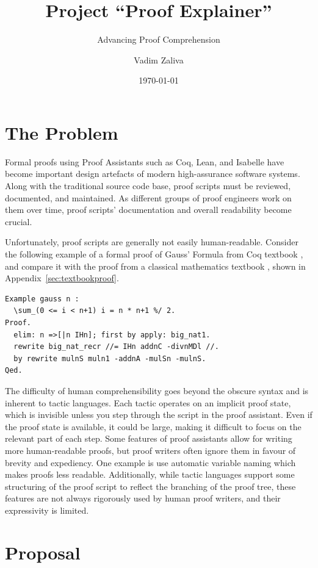\documentclass[10pt,nonacm,natbib=false]{acmart}
\title{Project ``Proof Explainer''}
\subtitle{Advancing Proof Comprehension}
\date{\today} %
\author{Vadim Zaliva}
\begin{document}
\maketitle

\section*{The Problem}

Formal proofs using Proof Assistants such as Coq, Lean, and Isabelle
have become important design artefacts of modern high-assurance
software systems. Along with the traditional source code base, proof
scripts must be reviewed, documented, and maintained. As different
groups of proof engineers work on them over time, proof scripts'
documentation and overall readability become crucial.

Unfortunately, proof scripts are generally not easily
human-readable. Consider the following example of a formal proof of
Gauss' Formula from Coq textbook \cite{mahboubi2021mathematical}, and
compare it with the proof from a classical mathematics textbook
\cite{roberts2014introduction}, shown in Appendix~\ref{sec:textbookproof}.

\begin{lstlisting}
Example gauss n :
  \sum_(0 <= i < n+1) i = n * n+1 %/ 2.
Proof.
  elim: n =>[|n IHn]; first by apply: big_nat1.
  rewrite big_nat_recr //= IHn addnC -divnMDl //.
  by rewrite mulnS muln1 -addnA -mulSn -mulnS.
Qed.
\end{lstlisting}

The difficulty of human comprehensibility goes beyond the obscure
syntax and is inherent to tactic languages. Each tactic operates on an
implicit proof state, which is invisible unless you step through the
script in the proof assistant. Even if the proof state is available,
it could be large, making it difficult to focus on the relevant part
of each step. Some features of proof assistants allow for writing more
human-readable proofs, but proof writers often ignore them in favour
of brevity and expediency. One example is use automatic variable
naming which makes proofs less readable. Additionally, while tactic
languages support some structuring of the proof script to reflect the
branching of the proof tree, these features are not always rigorously
used by human proof writers, and their expressivity is limited.

\section*{Proposal}
\end{document}
